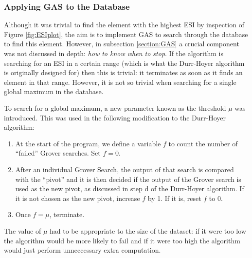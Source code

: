 \documentclass{article}[11pt]
\begin{document}
\subsubsection{Applying GAS to the Database}\label{sec:GASonESI}
Although it was trivial to find the element with the highest ESI by inspection of Figure \ref{fig:ESIplot}, the aim is to implement GAS to search through the database to find this element. However, in subsection \ref{section:GAS} a crucial component was not discussed in depth: \emph{how to know when to stop}. If the algorithm is searching for an ESI in a certain range (which is what the Durr-Hoyer algorithm is originally designed for) then this is trivial: it terminates as soon as it finds an element in that range. However, it is not so trivial when searching for a single global maximum in the database.

To search for a global maximum, a new parameter known as the threshold $\mu$ was introduced. This was used in the following modification to the Durr-Hoyer algorithm:
\begin{enumerate}
    \item At the start of the program, we define a variable $f$ to count the number of ``failed'' Grover searches. Set $f=0$.
    \item After an individual Grover Search, the output of that search is compared with the ``pivot'' and it is then decided if the output of the Grover search is used as the new pivot, as discussed in step d of the Durr-Hoyer algorithm. If it is not chosen as the new pivot, increase $f$ by 1. If it is, reset $f$ to 0.
    \item Once $f=\mu$, terminate.
\end{enumerate}

The value of $\mu$ had to be appropriate to the size of the dataset: if it were too low the algorithm would be more likely to fail and if it were too high the algorithm would just perform unneccessary extra computation.
\end{document}
